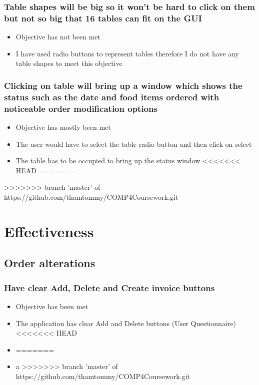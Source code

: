 \subsubsection{Table shapes will be big so it won't be hard to click on them but not so big that 16 tables can fit on the GUI}
\begin{itemize}
	\item Objective has not been met
	\item I have used radio buttons to represent tables therefore I do not have any table shapes to meet this objective

\end{itemize}

\subsubsection{Clicking on table will bring up a window which shows the status such as the date and food items ordered with noticeable order modification options}
\begin{itemize} 
	\item Objective has mostly been met
	\item The user would have to select the table radio button and then click on select
	\item The table has to be occupied to bring up the status window
<<<<<<< HEAD
=======
\end{itemize}
>>>>>>> branch 'master' of https://github.com/thamtommy/COMP4Coursework.git
\section{Effectiveness}

\subsection{Order alterations}
\subsubsection{Have clear Add, Delete and Create invoice buttons}
\begin{itemize}
	\item Objective has been met
	\item The application has clear Add and Delete buttons (User Questionnaire)
<<<<<<< HEAD
	\item 
=======
	\item  a
>>>>>>> branch 'master' of https://github.com/thamtommy/COMP4Coursework.git
\end{itemize}



